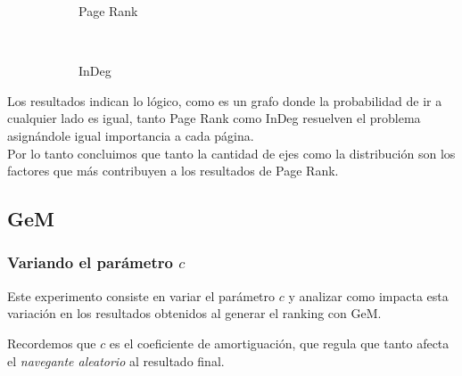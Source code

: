 \begin{figure}[H]
    \centering
    \begin{subfigure}[t]{0.5\textwidth}
      \begin{center}
        Page Rank\\
      \end{center}
    \end{subfigure}%
    ~
    \begin{subfigure}[t]{0.5\textwidth}
      \begin{center}
        InDeg\\
      \end{center}
    \end{subfigure}
\end{figure}

Los resultados indican lo lógico, como es un grafo donde la probabilidad de ir a cualquier lado es igual, tanto Page Rank como InDeg resuelven el problema asignándole igual importancia a cada página.\\
Por lo tanto concluimos que tanto la cantidad de ejes como la distribución son los factores que más contribuyen a los resultados de Page Rank.

\subsection{GeM}

\subsubsection{Variando el parámetro $c$}\label{exp_gem_2}
Este experimento consiste en variar el parámetro $c$ y analizar como impacta esta
variación en los resultados obtenidos al generar el ranking con GeM.

Recordemos que $c$ es el coeficiente de amortiguación, que regula que tanto afecta
el \textit{navegante aleatorio} al resultado final.

